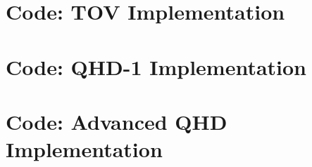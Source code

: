 \chapter{Code: TOV Implementation}\label{ch: tov code}



\chapter{Code: QHD-1 Implementation}\label{ch: qhd1 code}



\chapter{Code: Advanced QHD Implementation}\label{ch: advanced code}


